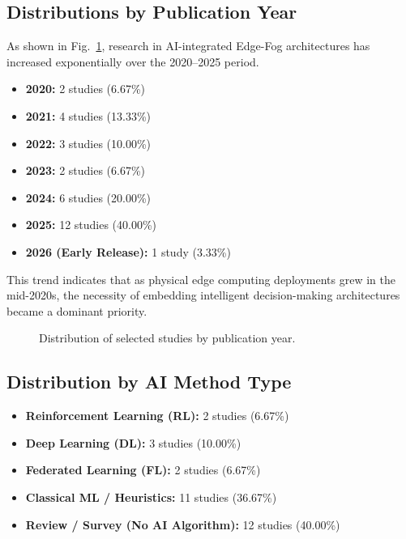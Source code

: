 \documentclass[conference]{IEEEtran}
\begin{document}
\subsection{Distributions by Publication Year}
As shown in Fig.~\ref{fig:stats_year}, research in AI-integrated Edge-Fog architectures has increased exponentially over the 2020--2025 period.
\begin{itemize}
    \item \textbf{2020:} 2 studies (6.67\%) \cite{b16, b25}
    \item \textbf{2021:} 4 studies (13.33\%) \cite{b1, b20, b21, b23}
    \item \textbf{2022:} 3 studies (10.00\%) \cite{b4, b15, b19}
    \item \textbf{2023:} 2 studies (6.67\%) \cite{b10, b14}
    \item \textbf{2024:} 6 studies (20.00\%) \cite{b3, b6, b7, b13, b17, b29}
    \item \textbf{2025:} 12 studies (40.00\%) \cite{b2, b5, b8, b9, b11, b12, b18, b22, b26, b27, b28, b30}
    \item \textbf{2026 (Early Release):} 1 study (3.33\%) \cite{b24}
\end{itemize}

This trend indicates that as physical edge computing deployments grew in the mid-2020s, the necessity of embedding intelligent decision-making architectures became a dominant priority.

\begin{figure}[h]
\centering
{}
\caption{Distribution of selected studies by publication year.}
\label{fig:stats_year}
\end{figure}

\subsection{Distribution by AI Method Type}
\begin{itemize}
    \item \textbf{Reinforcement Learning (RL):} 2 studies (6.67\%) \cite{b3, b30}
    \item \textbf{Deep Learning (DL):} 3 studies (10.00\%) \cite{b11, b12, b13}
    \item \textbf{Federated Learning (FL):} 2 studies (6.67\%) \cite{b8, b29}
    \item \textbf{Classical ML / Heuristics:} 11 studies (36.67\%) \cite{b4, b7, b17, b18, b20, b21, b23, b25, b27, b30}
    \item \textbf{Review / Survey (No AI Algorithm):} 12 studies (40.00\%) \cite{b1, b2, b5, b6, b9, b10, b14, b15, b16, b19, b22, b26, b28}
\end{itemize}
\end{document}

